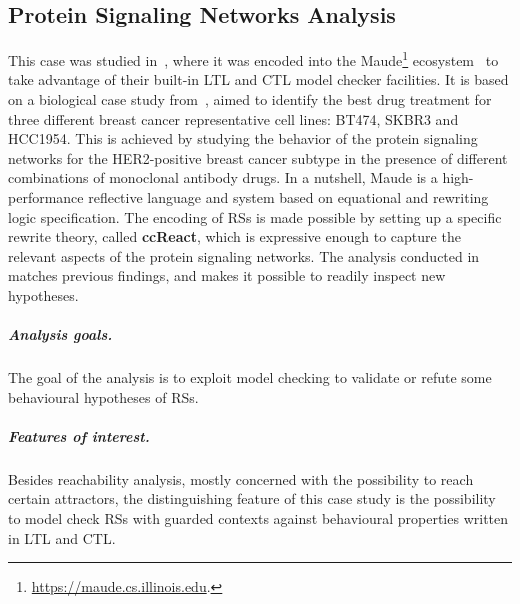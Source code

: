 
\subsection{Protein Signaling Networks Analysis}\label{sec:ccReact}

This case was studied in~\cite{DBLP:conf/cmsb/BallisBFO24}, where it was encoded into the Maude\footnote{\url{https://maude.cs.illinois.edu}.} ecosystem~\cite{DBLP:conf/maude/2007} to take advantage of their built-in LTL and CTL model checker facilities. It is based on a biological case study from~\cite{derHeyde2014}, aimed to identify the best drug treatment for three different breast cancer representative cell lines: BT474, SKBR3 and HCC1954. This is achieved by studying the behavior of the protein signaling networks for the HER2-positive breast cancer subtype in the presence of different combinations of monoclonal antibody drugs.
In a nutshell, Maude is a high-performance reflective language and system based on equational and rewriting logic specification. 
The encoding of RSs is made possible by setting up a specific rewrite theory, called \textbf{ccReact}, which is expressive enough to capture the relevant aspects of the protein signaling networks.
The analysis conducted in~\cite{DBLP:conf/cmsb/BallisBFO24} matches previous findings, and makes it possible to readily inspect new hypotheses.

\subparagraph*{Analysis goals.}
The goal of the analysis is to exploit model checking to validate or refute some behavioural hypotheses of RSs.

\subparagraph*{Features of interest.}
Besides reachability analysis, mostly concerned with the possibility to reach certain attractors, the distinguishing feature of this case study is the possibility to model check RSs with guarded contexts against behavioural properties written in LTL and CTL.

